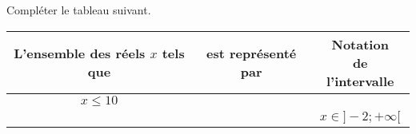 \documentclass[11pt]{article}
\begin{document}
\begin{exemple}
  Compléter le tableau suivant.
  \begin{center}
  \renewcommand{\arraystretch}{2}
  \begin{tabular}{|c|c|c|}
    \hline
    \makecell{L'ensemble des\\réels $x$ tels que} &\phantom{c'est pas terrible}est représenté
    par\phantom{c'est pas terrible}&\makecell{Notation\\de l'intervalle} \\
      \hline
      $x\leq 10$ & & \\
      \hline
      & & $x\in]-2; +\infty[$ \\
      \hline
  \end{tabular}
   
  \end{center}
\end{exemple}
\end{document}
